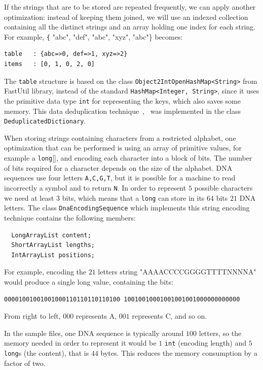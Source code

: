 \documentclass[a4paper,twoside]{article}
\begin{document}
{If the strings that are to be stored are repeated frequently, we can apply another optimization:
instead of keeping them joined, we will use an indexed collection containing all the distinct strings and an array holding one index for each string.
For example, {\texttt{\{} "abc", "def", "abc", "xyz", "abc"\}} becomes:
\begin{verbatim}
table   : {abc=>0, def=>1, xyz=>2}
items   : [0, 1, 0, 2, 0]
\end{verbatim}
The {\texttt{table}} structure is based on the class {\texttt{Object2IntOpenHashMap<String>}} from FastUtil library, instead of the standard {\texttt{HashMap<Integer, String>}}, since it uses the primitive data type {\texttt{int}} for representing the keys, which also saves some memory.
This data deduplication technique~\cite{he:2010},~\cite{manogar:2014} was implemented in the class {\texttt{DeduplicatedDictionary}}.

When storing strings containing characters from a restricted alphabet, one optimization that can be performed is using an array of primitive values, for example a {\texttt{long}[]}, and encoding each character into a block of bits.
The number of bits required for a character depends on the size of the alphabet.
DNA sequences use four letters {\texttt{A,C,G,T}}, but it is possible for a machine to read incorrectly a symbol and to return {\texttt{N}}.
In order to represent $5$ possible characters we need at least $3$ bits,
which means that a {\texttt{long}} can store in its $64$ bits $21$ DNA letters.
The class {\texttt{DnaEncodingSequence}} which implements this string encoding technique contains the following members:
\begin{verbatim}
  LongArrayList content;
  ShortArrayList lengths;      
  IntArrayList positions;     
\end{verbatim}
For example, encoding the $21$ letters string "AAAACCCCGGGGTTTTNNNNA" would produce a single long value, containing the bits:\\
{\texttt{00001001001001000110110110110100
10010010001001001001000000000000}

}

From right to left, $000$ represents A, $001$ represents C, and so on.

In the sample files, one DNA sequence is typically around $100$ letters, so the memory needed in order to represent it would be $1$ {\texttt{int}} (encoding length) and $5$ {\texttt{long}}s (the content), that is $44$ bytes.
This reduces the memory consumption by a factor of two.

}
\end{document}
